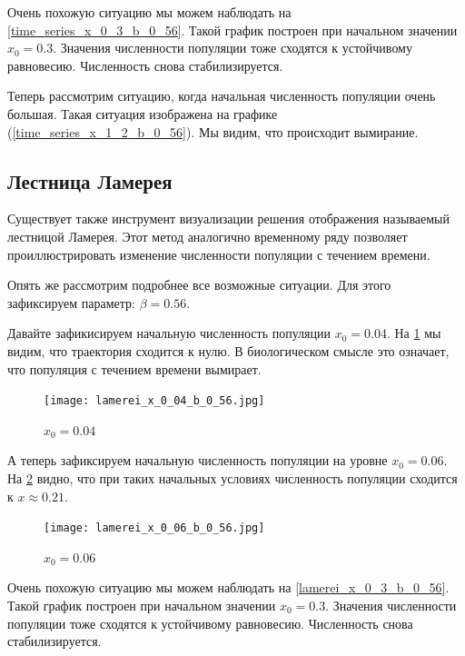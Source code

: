         Очень похожую ситуацию мы можем наблюдать на \ref{time_series_x_0_3_b_0_56}. Такой график построен при начальном значении \(x_0 = 0.3\). Значения численности популяции тоже сходятся к устойчивому равновесию. Численность снова стабилизируется.

        Теперь рассмотрим ситуацию, когда начальная численность популяции очень большая. Такая ситуация изображена на графике (\ref{time_series_x_1_2_b_0_56}). Мы видим, что происходит вымирание.

    \subsection{Лестница Ламерея}
    
        Существует также инструмент визуализации решения отображения называемый лестницой Ламерея. Этот метод аналогично временному ряду позволяет проиллюстрировать изменение численности популяции с течением времени.
            
        Опять же рассмотрим подробнее все возможные ситуации. Для этого зафиксируем параметр: \(\beta = 0.56\). 
    
        Давайте зафикисируем начальную численность популяции \(x_0 = 0.04\). На \ref{lamerei_x_0_04_b_0_56} мы видим, что траектория сходится к нулю. В биологическом смысле это означает, что популяция с течением времени вымирает.
    
        \begin{figure}
            \centering
            \texttt{[image: lamerei\_x\_0\_04\_b\_0\_56.jpg]}
    
            \captionsetup{justification=centering}
            \caption{\(x_0 = 0.04\)}
            \label{lamerei_x_0_04_b_0_56}
        \end{figure}
    
        А теперь зафиксируем начальную численность популяции на уровне \(x_0 = 0.06\). На \ref{lamerei_x_0_06_b_0_56} видно, что при таких начальных условиях численность популяции сходится к \(x \approx 0.21\).
            
        \begin{figure}
            \centering
            \texttt{[image: lamerei\_x\_0\_06\_b\_0\_56.jpg]}
    
            \captionsetup{justification=centering}
            \caption{\(x_0 = 0.06\)}
            \label{lamerei_x_0_06_b_0_56}
        \end{figure}
    
        Очень похожую ситуацию мы можем наблюдать на \ref{lamerei_x_0_3_b_0_56}. Такой график построен при начальном значении \(x_0 = 0.3\). Значения численности популяции тоже сходятся к устойчивому равновесию. Численность снова стабилизируется.
            
